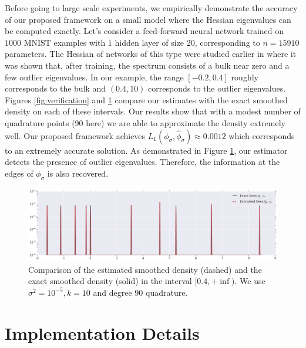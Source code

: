 \documentclass{article}
\newcommand{\phis}{\phi_{\sigma}}
\begin{document}
Before going to large scale experiments, we empirically demonstrate the accuracy of our proposed framework on a small model where the Hessian eigenvalues can be computed exactly. Let's consider a feed-forward neural network trained on $1000$ MNIST examples with $1$ hidden layer of size $20$, corresponding to $n=15910$ parameters. The Hessian of networks of this type were studied earlier in \cite{sagun2017empirical} where it was shown that, after training, the spectrum consists of a bulk near zero and a few outlier eigenvalues. In our example, the range $[-0.2, 0.4]$ roughly corresponds to the bulk and $(0.4, 10)$ corresponds to the outlier eigenvalues. Figures \ref{fig:verification} and \ref{fig:verification_outliers} compare our estimates with the exact smoothed density on each of these intervals. Our results show that with a modest number of quadrature points (90 here) we are able to approximate the density extremely well. %
Our proposed framework achieves $L_1(\phis, \widehat{\phi}_{\sigma}) \approx 0.0012$ which corresponds to an extremely accurate solution. As demonstrated in Figure \ref{fig:verification_outliers}, our estimator detects the presence of outlier eigenvalues. Therefore, the information at the edges of $\phis$ is also recovered. 


\begin{figure}[h]
\includegraphics[width=\textwidth]{verification_outliers.png}
\vspace{-0.5cm}
\caption{Comparison of the estimated smoothed density (dashed) and the exact smoothed density (solid) in the interval $[0.4, +\inf)$. We use $\sigma^2 = 10^{-5}, k=10$ and degree $90$ quadrature. \label{fig:verification_outliers}}
\end{figure}

\section{Implementation Details}
\label{app:implementation}
\end{document}
